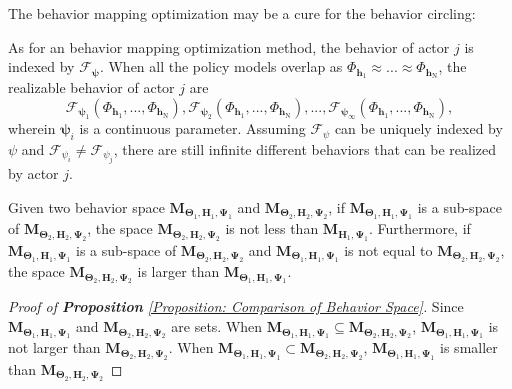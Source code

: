 The behavior mapping optimization may be a cure for the behavior circling:
\begin{Corollary}
\label{Corollary: behavior mapping optimization is an Antidote for Behavior Circling}
As for an behavior mapping optimization method, the behavior of actor $j$ is indexed by $\mathcal{F}_{\bm{\psi}}$. When all the policy models overlap as $\Phi_{\mathbf{h}_1} \approx ... \approx \Phi_{\mathbf{h}_\mathrm{N}}$, the realizable behavior of actor $j$ are 
\begin{equation}
    \mathcal{F}_{\bm{\psi}_1}(\Phi_{\mathbf{h}_1},...,\Phi_{\mathbf{h}_\mathrm{N}}), \mathcal{F}_{\bm{\psi}_2}(\Phi_{\mathbf{h}_1},...,\Phi_{\mathbf{h}_\mathrm{N}}), ..., \mathcal{F}_{\bm{\psi}_\infty}(\Phi_{\mathbf{h}_1},...,\Phi_{\mathbf{h}_\mathrm{N}}),
\end{equation}
wherein $\bm{\psi}_i$ is a continuous parameter.
Assuming $\mathcal{F}_{\psi}$ can be uniquely indexed by $\psi$ and $\mathcal{F}_{\psi_i} \neq \mathcal{F}_{\psi_j}$, there are still infinite different behaviors that can be realized by actor $j$.
\end{Corollary}


\begin{Proposition}
\label{Proposition: Comparison of Behavior Space}
Given two behavior space $\mathbf{M}_{\bm{\Theta}_1,\mathbf{H}_1,\bm{\Psi}_1}$ and $\mathbf{M}_{\bm{\Theta}_2,\mathbf{H}_2,\bm{\Psi}_2}$, if $\mathbf{M}_{\bm{\Theta}_1,\mathbf{H}_1,\bm{\Psi}_1}$ is a sub-space of $\mathbf{M}_{\bm{\Theta}_2,\mathbf{H}_2,\bm{\Psi}_2}$, the space $\mathbf{M}_{\bm{\Theta}_2, \mathbf{H}_2,\bm{\Psi}_2}$  is not less than  $\mathbf{M}_{\mathbf{H}_1,\bm{\Psi}_1}$. Furthermore, if $\mathbf{M}_{\bm{\Theta}_1,\mathbf{H}_1,\bm{\Psi}_1}$ is a sub-space of $\mathbf{M}_{\bm{\Theta}_2,\mathbf{H}_2,\bm{\Psi}_2}$ and $\mathbf{M}_{\bm{\Theta}_1,\mathbf{H}_1,\bm{\Psi}_1}$ is not equal to $\mathbf{M}_{\bm{\Theta}_2,\mathbf{H}_2,\bm{\Psi}_2}$, the space $\mathbf{M}_{\bm{\Theta}_2,\mathbf{H}_2,\bm{\Psi}_2}$  is larger than  $\mathbf{M}_{\bm{\Theta}_1, \mathbf{H}_1,\bm{\Psi}_1}$.
\end{Proposition}

\begin{proof}[Proof of \textbf{Proposition} \ref{Proposition: Comparison of Behavior Space}]
    Since $\mathbf{M}_{\bm{\Theta}_1,\mathbf{H}_1,\bm{\Psi}_1}$ and $\mathbf{M}_{\bm{\Theta}_2,\mathbf{H}_2,\bm{\Psi}_2}$ are sets. When $\mathbf{M}_{\bm{\Theta}_1,\mathbf{H}_1,\bm{\Psi}_1} \subseteq \mathbf{M}_{\bm{\Theta}_2,\mathbf{H}_2,\bm{\Psi}_2}$, $\mathbf{M}_{\bm{\Theta}_1,\mathbf{H}_1,\bm{\Psi}_1}$ is not larger than $ \mathbf{M}_{\bm{\Theta}_2,\mathbf{H}_2,\bm{\Psi}_2}$. When $\mathbf{M}_{\bm{\Theta}_1,\mathbf{H}_1,\bm{\Psi}_1} \subset \mathbf{M}_{\bm{\Theta}_2,\mathbf{H}_2,\bm{\Psi}_2}$, $\mathbf{M}_{\bm{\Theta}_1,\mathbf{H}_1,\bm{\Psi}_1}$ is smaller than $\mathbf{M}_{\bm{\Theta}_2,\mathbf{H}_2,\bm{\Psi}_2}$
\end{proof}


